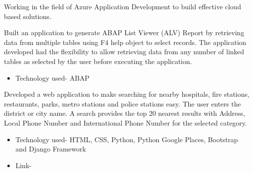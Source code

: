 \documentclass[9.5pt,a4paper]{altacv}
\begin{document}
\tagline{}

\begin{fullwidth}
\makecvheader
\end{fullwidth}


\bigskip

Working in the field of Azure Application Development to build effective cloud based solutions. 

\divider

Built an application to generate ABAP List Viewer (ALV) Report by retrieving data from multiple tables using F4 help object to select records. The application developed had the flexibility to allow retrieving data from any number of linked tables as selected by the user before executing the application.
\begin{itemize}
\item Technology used- ABAP
\end{itemize}

\divider

Developed a web application to make searching for nearby hospitals, fire stations, restaurants, parks, metro stations and police stations easy. The user enters the district or city name. A search provides the top 20 nearest results with Address, Local Phone Number and International Phone Number for the selected category.
\begin{itemize}
\item Technology used- HTML, CSS, Python, Python Google Places, Bootstrap and Django Framework
\item Link- \href{https://find-my-perfect-place.herokuapp.com/}{}
\end{itemize}
\end{document}
